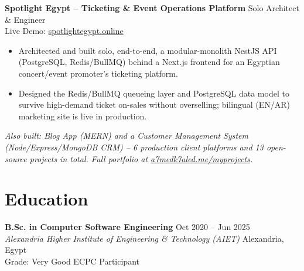 \documentclass[10pt,letterpaper]{article}
\newcommand{\sectionrule}{\vspace{-1pt}{\color{hairline}\hrule height 0.6pt}\vspace{2pt}}
\newcommand{\entryHeading}[4]{%
  \textbf{#1} \hfill {\small\color{muted}#2}\\
  {\small\color{muted}\textit{#3}} \hfill {\small\color{muted}#4}\\[0pt]
}
\newcommand{\lineHeading}[2]{%
  \textbf{#1} \hfill {\small\color{muted}#2}\\[0pt]
}
\newcommand{\linkLine}[3]{{\footnotesize\color{muted}#1: }{\footnotesize\href{#2}{#3}}\\[0pt]}
\newcommand{\sectionNote}[1]{{\footnotesize\color{muted}\itshape#1}}
\begin{document}
\lineHeading{Spotlight Egypt -- Ticketing \& Event Operations Platform}{Solo Architect \& Engineer}
\linkLine{Live Demo}{https://spotlightegypt.online/}{spotlightegypt.online}
{\small
\begin{itemize}
    \item Architected and built solo, end-to-end, a modular-monolith NestJS API (PostgreSQL, Redis/BullMQ)
    behind a Next.js frontend for an Egyptian concert/event promoter's ticketing platform.
    \item Designed the Redis/BullMQ queueing layer and PostgreSQL data model to survive high-demand ticket
    on-sales without overselling; bilingual (EN/AR) marketing site is live in production.
\end{itemize}
}

\vspace{2pt}
\sectionNote{Also built: Blog App (MERN) and a Customer Management System (Node/Express/MongoDB CRM) -- 6
production client platforms and 13 open-source projects in total. Full portfolio at
\href{https://a7medk7aled.me/myprojects}{a7medk7aled.me/myprojects}.}

\section*{Education}
\sectionrule
\entryHeading{B.Sc. in Computer Software Engineering}{Oct 2020 -- Jun 2025}{Alexandria Higher Institute of Engineering \& Technology (AIET)}{Alexandria, Egypt}
{\small Grade: Very Good \quad\textperiodcentered\quad ECPC Participant}
\end{document}
